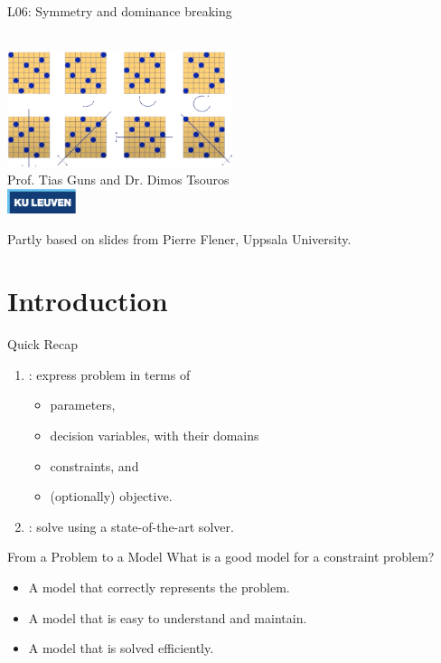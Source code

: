 \documentclass{cons-beamer}
\begin{document}
\begin{frame}{L06: Symmetry and dominance breaking}
  \begin{center}
    ~ \\
    \includegraphics[height=34mm]{images/nqueens3.png} \\
    \vfill
    Prof. Tias Guns and Dr. Dimos Tsouros \\[0.5em]
    \includegraphics[width=2cm]{images/kuleuven_CMYK_logo.pdf}
  \end{center}
  
  {\footnotesize 
  Partly based on slides from Pierre Flener, Uppsala University.}
\end{frame}


\section{Introduction}

\begin{frame}{Quick Recap}
  \begin{enumerate}
    \item {}: express problem in terms of \vfill
      \begin{itemize}
      \item parameters, \vfill
      \item decision variables, with their domains \vfill
      \item constraints, and \vfill
      \item (optionally) objective.
      \end{itemize} \vfill
    \item {}: solve using a state-of-the-art solver.
  \end{enumerate}
\end{frame}

\begin{frame}{From a Problem to a Model} 
  What is a good model for a constraint problem? \vfill
  \begin{itemize}
    \item A model that \alert{correctly} represents the problem. \vfill
    \item A model that is \alert{easy} to understand and maintain. \vfill
    \item A model that is solved \alert{efficiently}. \vfill
  \end{itemize}\vfill
\end{frame}
\end{document}
